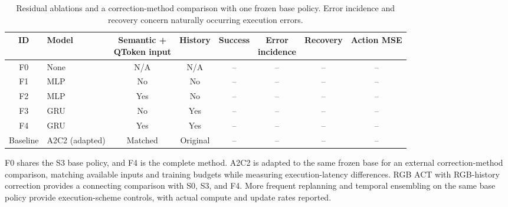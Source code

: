 \begin{table}[!t]
\caption{Residual ablations and a correction-method comparison with one frozen base policy. Error incidence and recovery concern naturally occurring execution errors.}
\label{tab:feedbackablation}
\centering\small
\setlength{\tabcolsep}{5pt}
\begin{tabular}{clcccccc}
\toprule
ID & Model & \shortstack{Semantic +\\QToken input} & History & Success & \shortstack{Error\\incidence} & Recovery & Action MSE\\
\midrule
F0 & None & N/A & N/A & -- & -- & -- & --\\
F1 & MLP & No & No & -- & -- & -- & --\\
F2 & MLP & Yes & No & -- & -- & -- & --\\
F3 & GRU & No & Yes & -- & -- & -- & --\\
F4 & GRU & Yes & Yes & -- & -- & -- & --\\
\midrule
Baseline & A2C2 (adapted) & Matched & Original & -- & -- & -- & --\\
\bottomrule
\end{tabular}
\end{table}
F0 shares the S3 base policy, and F4 is the complete method.
A2C2 is adapted to the same frozen base for an external correction-method comparison, matching available inputs and training budgets while measuring execution-latency differences.
RGB ACT with RGB-history correction provides a connecting comparison with S0, S3, and F4.
More frequent replanning and temporal ensembling on the same base policy provide execution-scheme controls, with actual compute and update rates reported.


